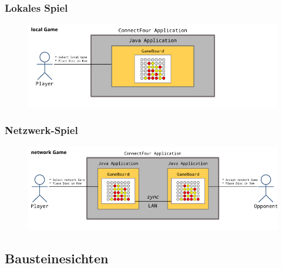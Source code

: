 \documentclass[a4paper, 10pt, fleqn]{article}
\begin{document}
\subsubsection{Lokales Spiel}
\begin{figure}[h!]
    \center
    \includegraphics[width=\textwidth]{fig/local-game.png}
\end{figure}

\subsubsection{Netzwerk-Spiel}
\begin{figure}[h!]
    \center
    \includegraphics[width=\textwidth]{fig/network-game.png}
\end{figure}

\subsection{Bausteinesichten}
\end{document}
